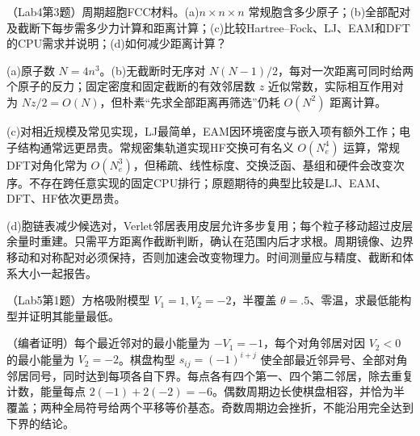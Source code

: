 \begin{example}
（Lab4第3题）周期超胞FCC材料。(a)$n\times n\times n$ 常规胞含多少原子；(b)全部配对及截断下每步需多少力计算和距离计算；(c)比较Hartree--Fock、LJ、EAM和DFT的CPU需求并说明；(d)如何减少距离计算？
\end{example}
\begin{solution}
(a)原子数 $N=4n^3$。(b)无截断时无序对 $N(N-1)/2$，每对一次距离可同时给两个原子的反力；固定密度和固定截断的有效邻居数 $z$ 近似常数，实际相互作用对为 $Nz/2=O(N)$，但朴素“先求全部距离再筛选”仍耗 $O(N^2)$ 距离计算。

(c)对相近规模及常见实现，LJ最简单，EAM因环境密度与嵌入项有额外工作；电子结构通常远更昂贵。常规密集轨道实现HF交换可有名义 $O(N_e^4)$ 运算，常规DFT对角化常为 $O(N_e^3)$，但稀疏、线性标度、交换泛函、基组和硬件会改变次序。不存在跨任意实现的固定CPU排行；原题期待的典型比较是LJ、EAM、DFT、HF依次更昂贵。

(d)胞链表减少候选对，Verlet邻居表用皮层允许多步复用；每个粒子移动超过皮层余量时重建。只需平方距离作截断判断，确认在范围内后才求根。周期镜像、边界移动和对称配对必须保持，否则加速会改变物理力。时间测量应与精度、截断和体系大小一起报告。
\end{solution}

\begin{example}
（Lab5第1题）方格吸附模型 $V_1=1,V_2=-2$，半覆盖 $\theta=.5$、零温，求最低能构型并证明其能量最低。
\end{example}
\begin{solution}
（编者证明）每个最近邻对的最小能量为 $-V_1=-1$，每个对角邻居对因 $V_2<0$ 的最小能量为 $V_2=-2$。棋盘构型 $s_{ij}=(-1)^{i+j}$ 使全部最近邻异号、全部对角邻居同号，同时达到每项各自下界。每点各有四个第一、四个第二邻居，除去重复计数，能量每点 $2(-1)+2(-2)=-6$。偶数周期边长使棋盘相容，并恰为半覆盖；两种全局符号给两个平移等价基态。奇数周期边会挫折，不能沿用完全达到下界的结论。
\end{solution}

